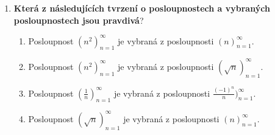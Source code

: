 \documentclass{article}
\begin{document}
\begin{enumerate}
    \item \textbf{Která z následujících tvrzení o posloupnostech a vybraných posloupnostech jsou pravdivá}?
    \begin{enumerate}
        \item Posloupnost $(n^2)_{n=1}^\infty$ je vybraná z posloupnosti $(n)_{n=1}^\infty$.
        \item Posloupnost $(n^2)_{n=1}^\infty$ je vybraná z posloupnosti $(\sqrt{n})_{n=1}^\infty$.
        \item Posloupnost $(\frac{1}{n})_{n=1}^\infty$ je vybraná z posloupnosti $\frac{(-1)^n}{n})_{n=1}^\infty$.
        \item Posloupnost $(\sqrt{n})_{n=1}^\infty$ je vybraná z posloupnosti $(n)_{n=1}^\infty$.
    \end{enumerate}
\end{enumerate}
\end{document}
